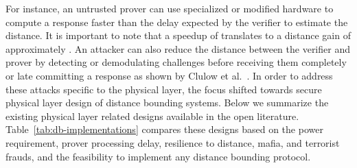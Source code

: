 \documentclass{sig-alternate-10pt}
\begin{document}
For instance, an untrusted prover can use specialized or modified hardware to
compute a response faster than the delay expected by the verifier to estimate
the distance. It is important to note that a speedup of  translates
to a distance gain of approximately . An attacker can also reduce
the distance between the verifier and prover by detecting or demodulating
challenges before receiving them completely or late committing a response as
shown by Clulow et al.~\cite{ClulowSep06}. In order to address these attacks
specific to the physical layer, the focus shifted towards secure physical layer
design of distance bounding systems. Below we summarize the existing
physical layer related designs available in the open literature.
Table~\ref{tab:db-implementations} compares these designs based on the power
requirement, prover processing delay, resilience to distance, mafia, and
terrorist frauds, and the feasibility to implement any distance bounding
protocol.
\end{document}
